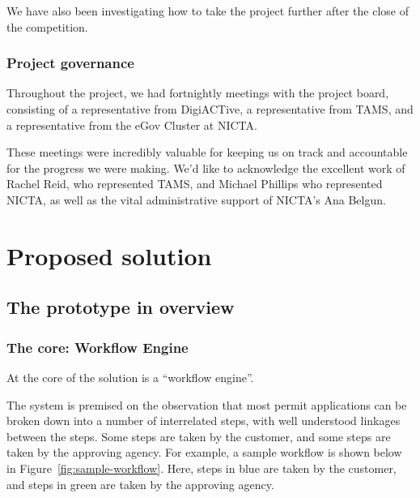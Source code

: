 \documentclass[12pt,a4paper,twosided]{article}
\begin{document}
We have also been investigating how to take the project further after
the close of the competition.

\subsubsection{Project governance}

Throughout the project, we had fortnightly meetings with the project
board, consisting of a representative from DigiACTive, a representative
from TAMS, and a representative from the eGov Cluster at NICTA.

These meetings were incredibly valuable for keeping us on track and
accountable for the progress we were making. We'd like to acknowledge
the excellent work of Rachel Reid, who represented TAMS, and Michael
Phillips who represented NICTA, as well as the vital administrative
support of NICTA's Ana Belgun.

\newpage
\section{Proposed solution}
\label{sec:solution}
\subsection{The prototype in overview}

\subsubsection{The core: Workflow Engine}

At the core of the solution is a ``workflow engine''.

The system is premised on the observation that most permit applications can be broken down into a number of interrelated steps, with well understood linkages between the steps. Some steps are taken by the customer, and some steps are taken by the approving agency. For example, a sample workflow is shown below in Figure~\ref{fig:sample-workflow}. Here, steps in blue are taken by the customer, and steps in green are taken by the approving agency.
\end{document}
